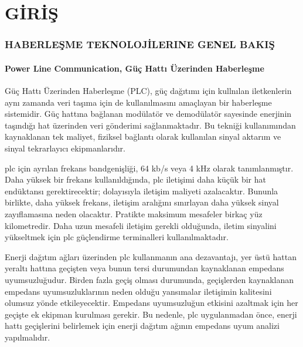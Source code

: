 
\part{GİRİŞ}
\thispagestyle{empty}
\newpage
\section{HABERLEŞME TEKNOLOJİLERINE GENEL BAKIŞ} \label{girisHaberlesme}
\subsection{Power Line Communication, Güç Hattı Üzerinden Haberleşme}
Güç Hattı Üzerinden Haberleşme (PLC), güç dağıtımı için kullnılan iletkenlerin aynı zamanda veri taşıma için de kullanılmasını amaçlayan bir haberleşme sistemidir. Güç hattına bağlanan modülatör ve demodülatör sayesinde enerjinin taşındığı hat üzerinden veri gönderimi sağlanmaktadır. Bu tekniği kullanımından kaynaklanan tek maliyet, fiziksel bağlantı olarak kullanılan sinyal aktarım ve sinyal tekrarlayıcı ekipmanlarıdır.

\gls{plc} için ayrılan frekans bandgenişliği, 64 kb/s veya 4 kHz olarak tanımlanmıştır. Daha yüksek bir frekans kullanıldığında, \gls{plc} iletişimi daha küçük bir hat endüktansı gerektirecektir; dolayısıyla iletişim maliyeti azalacaktır. Bununla birlikte, daha yüksek frekans, iletişim aralığını sınırlayan daha yüksek sinyal zayıflamasına neden olacaktır. Pratikte maksimum mesafeler birkaç yüz kilometredir. Daha uzun mesafeli iletişim gerekli olduğunda, iletim sinyalini yükseltmek için \gls{plc} güçlendirme terminalleri kullanılmaktadır.

Enerji dağıtım ağları üzerinden \gls{plc} kullanmanın ana dezavantajı, yer üstü hattan yeraltı hattına geçişten veya bunun tersi durumundan kaynaklanan empedans uyumsuzluğudur. Birden fazla geçiş olması durumunda, geçişlerden kaynaklanan empedans uyumsuzluklarının neden olduğu yansımalar iletişimin kalitesini olumsuz yönde etkileyecektir. Empedans uyumsuzluğun etkisini azaltmak için her geçişte ek ekipman kurulması gerekir. Bu nedenle, \gls{plc} uygulanmadan önce, enerji hattı geçişlerini belirlemek için enerji dağıtım ağının empedans uyum analizi yapılmalıdır\cite{duluau2015scada}.
\begin{comment}
\subsection{Radyo Dalgası}
Özellikle yenilenebilir enerji santrallerinin dağıtık kurulumundan kaynaklı, üre-tilen enerjinin merkeziyetçil kontrolü için bakır tel veya fiber optik kullanımı, kabloları döşemek ve güzergah için yapılacak altyapı işleri yüksek maliyetler gerektirmektedir. Radyo iletişimi kablolu haberleşme sistemlerinin getirmiş olduğu bant genişliğinin yerini almasa da radyo ağlarının güvenilirliği, performansı ve işletme maliyetleri son yıllarda önemli ölçüde artmıştır. Bu gelişmelerde kaynaklı olarak dağıtık enerji sistemlerinde tercih edilen bir haberleşme teknolojisidir\cite{bai2020radio}.
\end{comment}


